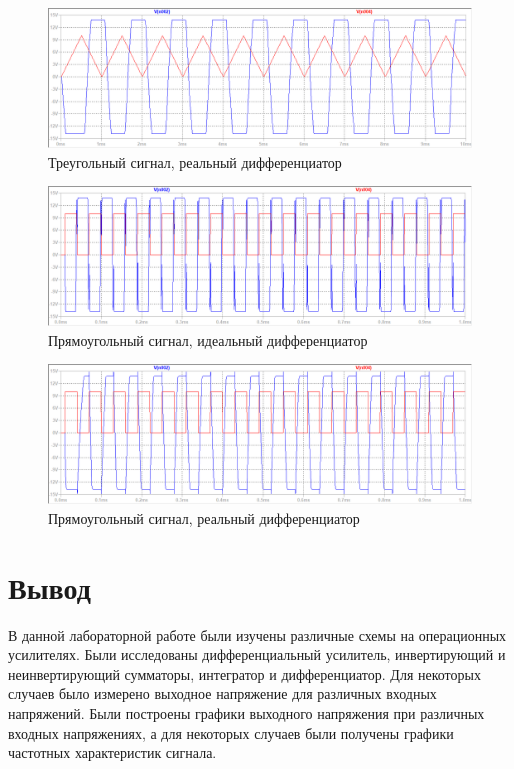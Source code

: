 \documentclass[a4paper, 12pt]{article}
\begin{document}
    \begin{figure}[H]
        \centering
        \includegraphics[scale=0.46]{4task_real_triangle.png}
        \captionsetup{skip=0pt}
        \caption{Треугольный сигнал, реальный дифференциатор}
        \label{fig:4task_real_triangle}
    \end{figure}
    \begin{figure}[H]
        \centering
        \includegraphics[scale=0.46]{4task_ideal_rect.png}
        \captionsetup{skip=0pt}
        \caption{Прямоугольный сигнал, идеальный дифференциатор}
        \label{fig:4task_ideal_rect}
    \end{figure}
    \begin{figure}[H]
        \centering
        \includegraphics[scale=0.46]{4task_real_rect.png}
        \captionsetup{skip=0pt}
        \caption{Прямоугольный сигнал, реальный дифференциатор}
        \label{fig:4task_real_rect}
    \end{figure}


    \section{Вывод}
    В данной лабораторной работе были изучены различные схемы на операционных
    усилителях. Были исследованы дифференциальный усилитель, инвертирующий и
    неинвертирующий сумматоры, интегратор и дифференциатор. Для некоторых случаев
    было измерено выходное напряжение для различных входных напряжений.
    Были построены графики выходного напряжения при различных входных напряжениях, а
    для некоторых случаев были получены графики частотных характеристик сигнала.
\end{document}

